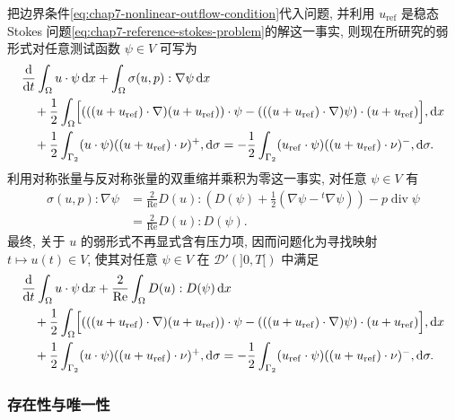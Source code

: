 \begin{sloppypar}
把边界条件\eqref{eq:chap7-nonlinear-outflow-condition}代入问题, 并利用 $u_{\mathrm{ref}}$ 是稳态 Stokes 问题\eqref{eq:chap7-reference-stokes-problem}的解这一事实, 则现在所研究的弱形式对任意测试函数 $\psi\in V$ 可写为
\[
\begin{aligned}
 &\frac{\mathrm d}{\mathrm dt}\int_\Omega u\cdot\psi\,\mathrm dx
 +\int_\Omega\sigma(u,p):\nabla\psi\,\mathrm dx\\
 &\quad+\frac12\int_\Omega\Bigl[
 (((u+u_{\mathrm{ref}})\cdot\nabla)(u+u_{\mathrm{ref}}))\cdot\psi
 -(((u+u_{\mathrm{ref}})\cdot\nabla)\psi)\cdot(u+u_{\mathrm{ref}})
 \Bigr],\mathrm dx\\
 &\quad+\frac12\int_{\Gamma_2}(u\cdot\psi)
 ((u+u_{\mathrm{ref}})\cdot\nu)^+,\mathrm d\sigma
 =-\frac12\int_{\Gamma_2}(u_{\mathrm{ref}}\cdot\psi)
 ((u+u_{\mathrm{ref}})\cdot\nu)^-,\mathrm d\sigma.
\end{aligned}
\]
利用对称张量与反对称张量的双重缩并乘积为零这一事实, 对任意 $\psi\in V$ 有
\[
\begin{aligned}
 \sigma(u,p):\nabla\psi
 &=\frac2{\operatorname{Re}}D(u):
 \left(D(\psi)+\frac12(\nabla\psi-{}^t\nabla\psi)\right)
 -p\operatorname{div}\psi\\
 &=\frac2{\operatorname{Re}}D(u):D(\psi).
\end{aligned}
\]
最终, 关于 $u$ 的弱形式不再显式含有压力项, 因而问题化为寻找映射 $t\mapsto u(t)\in V$, 使其对任意 $\psi\in V$ 在 $\mathcal D'(]0,T[)$ 中满足
\begin{equation}
\begin{aligned}
 &\frac{\mathrm d}{\mathrm dt}\int_\Omega u\cdot\psi\,\mathrm dx
 +\frac2{\operatorname{Re}}\int_\Omega D(u):D(\psi)\,\mathrm dx\\
 &\quad+\frac12\int_\Omega\Bigl[
 (((u+u_{\mathrm{ref}})\cdot\nabla)(u+u_{\mathrm{ref}}))\cdot\psi
 -(((u+u_{\mathrm{ref}})\cdot\nabla)\psi)\cdot(u+u_{\mathrm{ref}})
 \Bigr],\mathrm dx\\
 &\quad+\frac12\int_{\Gamma_2}(u\cdot\psi)
 ((u+u_{\mathrm{ref}})\cdot\nu)^+,\mathrm d\sigma
 =-\frac12\int_{\Gamma_2}(u_{\mathrm{ref}}\cdot\psi)
 ((u+u_{\mathrm{ref}})\cdot\nu)^-,\mathrm d\sigma.
\end{aligned}
\label{eq:chap7-outflow-weak-formulation}
\end{equation}

\subsubsection{存在性与唯一性}
\label{subsec:chap7-outflow-existence-uniqueness}


\end{sloppypar}
